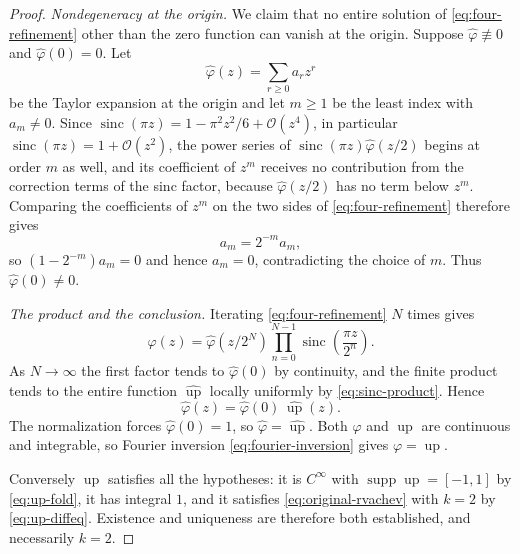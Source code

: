 \documentclass[11pt,oneside]{article}
\theoremstyle{definition}
\theoremstyle{remark}
\newcommand{\Up}{\operatorname{up}}
\newcommand{\sinc}{\operatorname{sinc}}
\newcommand{\bigO}{\mathcal O}
\newcommand{\supp}{\operatorname{supp}}
\begin{document}
\begin{proof}
\emph{Nondegeneracy at the origin.}  We claim that no entire solution of
\eqref{eq:four-refinement} other than the zero function can vanish at the origin.  Suppose
$\widehat\varphi\not\equiv0$ and $\widehat\varphi(0)=0$.  Let
\begin{equation*}
 \widehat\varphi(z)=\sum_{r\ge0}a_rz^r
\end{equation*}
be the Taylor expansion at the origin and let $m\ge1$ be the least index with $a_m\ne0$.
Since $\sinc(\pi z)=1-\pi^2z^2/6+\bigO(z^4)$, in particular $\sinc(\pi z)=1+\bigO(z^2)$, the
power series of $\sinc(\pi z)\widehat\varphi(z/2)$ begins at order $m$ as well, and its
coefficient of $z^m$ receives no contribution from the correction terms of the sinc factor,
because $\widehat\varphi(z/2)$ has no term below $z^m$.  Comparing the coefficients of $z^m$
on the two sides of \eqref{eq:four-refinement} therefore gives
\begin{equation*}
 a_m=2^{-m}a_m,
\end{equation*}
so $(1-2^{-m})a_m=0$ and hence $a_m=0$, contradicting the choice of $m$.  Thus
$\widehat\varphi(0)\ne0$.

\emph{The product and the conclusion.}  Iterating \eqref{eq:four-refinement} $N$ times gives
\begin{equation}
 \widehat\varphi(z)=\widehat\varphi(z/2^N)\prod_{n=0}^{N-1}\sinc\!\left(\frac{\pi z}{2^n}\right).
                                                          \label{eq:four-iterated-refinement}
\end{equation}
As $N\to\infty$ the first factor tends to $\widehat\varphi(0)$ by continuity, and the finite
product tends to the entire function $\widehat{\Up}$ locally uniformly by
\eqref{eq:sinc-product}.
Hence
\begin{equation}
 \widehat\varphi(z)=\widehat\varphi(0)\,\widehat{\Up}(z).
                                     \label{eq:four-Phi-scalar}
\end{equation}
The normalization forces $\widehat\varphi(0)=1$, so $\widehat\varphi=\widehat{\Up}$.  Both
$\varphi$ and $\Up$ are continuous and integrable, so Fourier inversion
\eqref{eq:fourier-inversion} gives $\varphi=\Up$.

Conversely $\Up$ satisfies all the hypotheses: it is $C^\infty$ with
$\supp\Up=[-1,1]$ by \eqref{eq:up-fold}, it has integral $1$, and it satisfies
\eqref{eq:original-rvachev} with $k=2$ by \eqref{eq:up-diffeq}.  Existence and uniqueness are
therefore both established, and necessarily $k=2$.
\end{proof}
\end{document}
